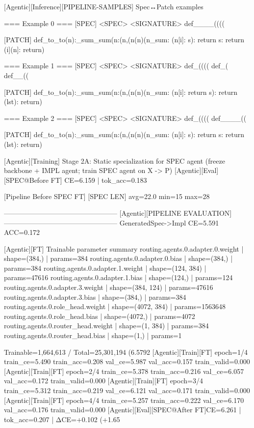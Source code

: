 [Agentic][Inference][PIPELINE-SAMPLES] Spec↔Patch examples

=== Example 0 ===
[SPEC]
<SPEC> <SIGNATURE> def____((((

[PATCH]
def_to_to(n):_sum_sum(n:(n,(n(n)(n_sum: (n[i]: s): return s: return (i](n]: return)

=== Example 1 ===
[SPEC]
<SPEC> <SIGNATURE> def_(((( def_( def__((

[PATCH]
def_to_to(n):_sum_sum(n:(n,(n(n)(n_sum: (n[i]: return s): return (lst): return)

=== Example 2 ===
[SPEC]
<SPEC> <SIGNATURE> def_(((( def____((

[PATCH]
def_to_to(n):_sum_sum(n:(n,(n(n)(n_sum: (n[i]: s): return s: return (lst): return)

[Agentic][Training] Stage 2A: Static specialization for SPEC agent (freeze backbone + IMPL agent; train SPEC agent on X -> P)
[Agentic][Eval][SPEC@Before FT] CE=6.159 | tok_acc=0.183

[Pipeline Before SPEC FT]
[SPEC LEN] avg=22.0 min=15 max=28

--------------------------------------------------
[Agentic][PIPELINE EVALUATION]
--------------------------------------------------
GeneratedSpec->Impl  CE=5.591 ACC=0.172

[Agentic][FT] Trainable parameter summary
routing.agents.0.adapter.0.weight | shape=(384,) | params=384
routing.agents.0.adapter.0.bias | shape=(384,) | params=384
routing.agents.0.adapter.1.weight | shape=(124, 384) | params=47616
routing.agents.0.adapter.1.bias | shape=(124,) | params=124
routing.agents.0.adapter.3.weight | shape=(384, 124) | params=47616
routing.agents.0.adapter.3.bias | shape=(384,) | params=384
routing.agents.0.role_head.weight | shape=(4072, 384) | params=1563648
routing.agents.0.role_head.bias | shape=(4072,) | params=4072
routing.agents.0.router_head.weight | shape=(1, 384) | params=384
routing.agents.0.router_head.bias | shape=(1,) | params=1

Trainable=1,664,613 / Total=25,301,194 (6.5792%
[Agentic][Train][FT] epoch=1/4 train_ce=5.490 train_acc=0.208 val_ce=5.987 val_acc=0.157 train_valid=0.000
[Agentic][Train][FT] epoch=2/4 train_ce=5.378 train_acc=0.216 val_ce=6.057 val_acc=0.172 train_valid=0.000
[Agentic][Train][FT] epoch=3/4 train_ce=5.312 train_acc=0.219 val_ce=6.121 val_acc=0.171 train_valid=0.000
[Agentic][Train][FT] epoch=4/4 train_ce=5.257 train_acc=0.222 val_ce=6.170 val_acc=0.176 train_valid=0.000
[Agentic][Eval][SPEC@After FT]CE=6.261 | tok_acc=0.207 | ΔCE=+0.102 (+1.65%

